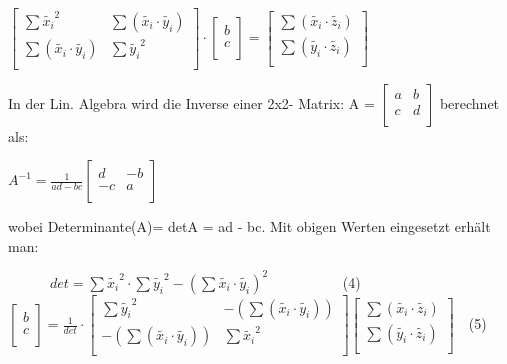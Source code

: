 \documentclass[12pt]{article}
\begin{document}
\begin{center}
\begin{large} 
$ \begin{bmatrix} \sum{ \widetilde{x_i}^2} & \sum{(\widetilde{x_i} \cdot\widetilde{y_i})} \\ \sum{( \widetilde{x_i} \cdot \widetilde{y_i} )} & \sum{\widetilde{y_i}^2} \\ \end{bmatrix} \cdot                                                                                                  \begin{bmatrix} b \\ c \\ \end{bmatrix} = \begin{bmatrix} \sum{(\widetilde{x_i} \cdot\widetilde{z_i})} \\ \sum{(\widetilde{y_i} \cdot\widetilde{z_i})}  \\ \end{bmatrix} $
\end{large}
\end{center}
%
In der Lin. Algebra wird die Inverse einer 2x2- Matrix:    
A = $ \begin{bmatrix} a & b \\ c & d \\ \end{bmatrix} $ berechnet als: 
\begin{center}
\begin{large} 
$ A^{-1} = \frac{1}{ad - bc} \begin{bmatrix}
d & -b \\
-c & a \\
\end{bmatrix} $
\end{large}
\end{center} 
wobei Determinante(A)= detA = ad - bc. Mit obigen Werten eingesetzt erhält man: \\
\begin{center}
\begin{Large}
$ \qquad \quad det = \sum{ \widetilde{x_i}^2} \cdot \sum{ \widetilde{y_i}^2}- (\sum{ \widetilde{x_i} \cdot \widetilde{y_i}})^2 \qquad \qquad \quad $ (4) \\[0.6cm]
$ \begin{bmatrix} b \\ c \\ \end{bmatrix} =
 \frac{1}{det} \cdot \begin{bmatrix} \sum{ \widetilde{y_i}^2} & -( \sum{(\widetilde{x_i} \cdot\widetilde{y_i})}) \\ -( \sum{( \widetilde{x_i} \cdot \widetilde{y_i} )}) & \sum{\widetilde{x_i}^2} \\ \end{bmatrix} 
 \begin{bmatrix} \sum{(\widetilde{x_i} \cdot\widetilde{z_i})} \\ \sum{(\widetilde{y_i} \cdot\widetilde{z_i})} \\ \end{bmatrix}\quad $(5) \\[0.4cm] 
\end{Large}
\end{center}
\end{document}
